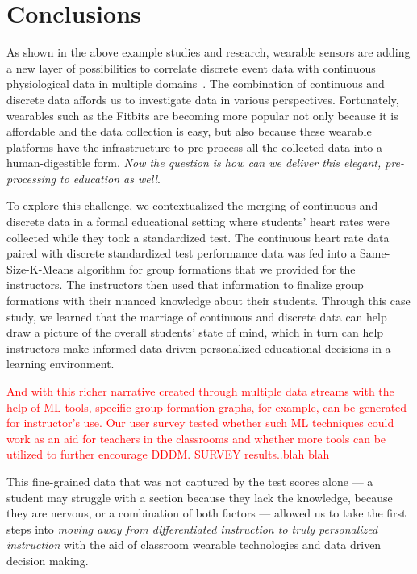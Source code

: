 \section{Conclusions}
As shown in the above example studies and research, wearable sensors are adding a new layer of possibilities to correlate discrete event data with continuous physiological data in multiple domains~\cite{alghowinem2016multimodal,huckins2019fusing,mehrotra2016towards,saeb2015mobile,wahle2016mobile}. The combination of continuous and discrete data affords us to investigate data in various perspectives. Fortunately, wearables such as the Fitbits are becoming more popular not only because it is affordable and the data collection is easy, but also because these wearable platforms have the infrastructure to pre-process all the collected data into a human-digestible form. \textit{Now the question is how can we deliver this elegant, pre-processing to education as well}. 

To explore this challenge, we contextualized the merging of continuous and discrete data in a formal educational setting where students' heart rates were collected while they took a standardized test. The continuous heart rate data paired with discrete standardized test performance data was fed into a Same-Size-K-Means algorithm for group formations that we provided for the instructors. The instructors then used that information to finalize group formations with their nuanced knowledge about their students. Through this case study, we learned that the marriage of continuous and discrete data can help draw a picture of the overall students' state of mind, which in turn can help instructors make informed data driven personalized educational decisions in a learning environment.


\textcolor{red}{And with this richer narrative created through multiple data streams with the help of ML tools, specific group formation graphs, for example, can be generated for instructor's use. Our user survey tested whether such ML techniques could work as an aid for teachers in the classrooms and whether more tools can be utilized to further encourage DDDM. SURVEY results..blah blah}

This fine-grained data that was not captured by the test scores alone --- a student may struggle with a section because they lack the knowledge, because they are nervous, or a combination of both factors --- allowed us to take the first steps into \textit{moving away from differentiated instruction to truly personalized instruction} with the aid of classroom wearable technologies and data driven decision making.
